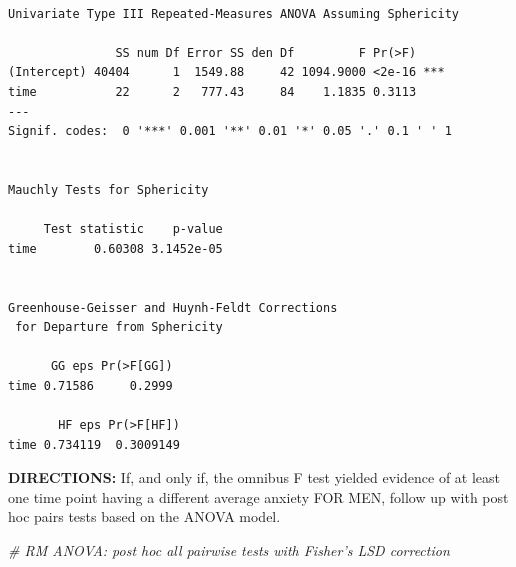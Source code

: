 \documentclass[]{article}
\newenvironment{Shaded}{\begin{snugshade}}{\end{snugshade}}
\newcommand{\KeywordTok}[1]{\textcolor[rgb]{0.13,0.29,0.53}{\textbf{#1}}}
\newcommand{\DataTypeTok}[1]{\textcolor[rgb]{0.13,0.29,0.53}{#1}}
\newcommand{\DecValTok}[1]{\textcolor[rgb]{0.00,0.00,0.81}{#1}}
\newcommand{\StringTok}[1]{\textcolor[rgb]{0.31,0.60,0.02}{#1}}
\newcommand{\CommentTok}[1]{\textcolor[rgb]{0.56,0.35,0.01}{\textit{#1}}}
\newcommand{\OperatorTok}[1]{\textcolor[rgb]{0.81,0.36,0.00}{\textbf{#1}}}
\newcommand{\NormalTok}[1]{#1}
\begin{document}
\begin{Shaded}
\end{Shaded}

\begin{verbatim}

Univariate Type III Repeated-Measures ANOVA Assuming Sphericity

               SS num Df Error SS den Df         F Pr(>F)    
(Intercept) 40404      1  1549.88     42 1094.9000 <2e-16 ***
time           22      2   777.43     84    1.1835 0.3113    
---
Signif. codes:  0 '***' 0.001 '**' 0.01 '*' 0.05 '.' 0.1 ' ' 1


Mauchly Tests for Sphericity

     Test statistic    p-value
time        0.60308 3.1452e-05


Greenhouse-Geisser and Huynh-Feldt Corrections
 for Departure from Sphericity

      GG eps Pr(>F[GG])
time 0.71586     0.2999

       HF eps Pr(>F[HF])
time 0.734119  0.3009149
\end{verbatim}

\clearpage

\textbf{DIRECTIONS:} If, and only if, the omnibus F test yielded
evidence of at least one time point having a different average anxiety
FOR MEN, follow up with post hoc pairs tests based on the ANOVA model.

\begin{Shaded}
\begin{Highlighting}[]
\CommentTok{# RM ANOVA: post hoc all pairwise tests with Fisher's LSD correction}
\end{Highlighting}
\end{Shaded}
\end{document}

